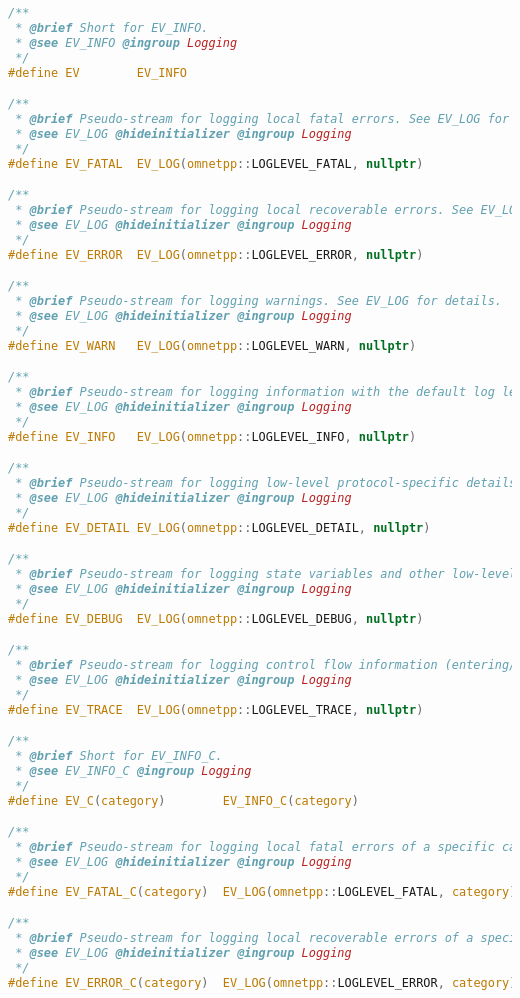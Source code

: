 \begin{lstlisting}[language=c]
/**
 * @brief Short for EV_INFO.
 * @see EV_INFO @ingroup Logging
 */
#define EV        EV_INFO

/**
 * @brief Pseudo-stream for logging local fatal errors. See EV_LOG for details.
 * @see EV_LOG @hideinitializer @ingroup Logging
 */
#define EV_FATAL  EV_LOG(omnetpp::LOGLEVEL_FATAL, nullptr)

/**
 * @brief Pseudo-stream for logging local recoverable errors. See EV_LOG for details.
 * @see EV_LOG @hideinitializer @ingroup Logging
 */
#define EV_ERROR  EV_LOG(omnetpp::LOGLEVEL_ERROR, nullptr)

/**
 * @brief Pseudo-stream for logging warnings. See EV_LOG for details.
 * @see EV_LOG @hideinitializer @ingroup Logging
 */
#define EV_WARN   EV_LOG(omnetpp::LOGLEVEL_WARN, nullptr)

/**
 * @brief Pseudo-stream for logging information with the default log level. See EV_LOG for details.
 * @see EV_LOG @hideinitializer @ingroup Logging
 */
#define EV_INFO   EV_LOG(omnetpp::LOGLEVEL_INFO, nullptr)

/**
 * @brief Pseudo-stream for logging low-level protocol-specific details. See EV_LOG for details.
 * @see EV_LOG @hideinitializer @ingroup Logging
 */
#define EV_DETAIL EV_LOG(omnetpp::LOGLEVEL_DETAIL, nullptr)

/**
 * @brief Pseudo-stream for logging state variables and other low-level information. See EV_LOG for details.
 * @see EV_LOG @hideinitializer @ingroup Logging
 */
#define EV_DEBUG  EV_LOG(omnetpp::LOGLEVEL_DEBUG, nullptr)

/**
 * @brief Pseudo-stream for logging control flow information (entering/exiting functions, etc). See EV_LOG for details.
 * @see EV_LOG @hideinitializer @ingroup Logging
 */
#define EV_TRACE  EV_LOG(omnetpp::LOGLEVEL_TRACE, nullptr)

/**
 * @brief Short for EV_INFO_C.
 * @see EV_INFO_C @ingroup Logging
 */
#define EV_C(category)        EV_INFO_C(category)

/**
 * @brief Pseudo-stream for logging local fatal errors of a specific category. See EV_LOG for details.
 * @see EV_LOG @hideinitializer @ingroup Logging
 */
#define EV_FATAL_C(category)  EV_LOG(omnetpp::LOGLEVEL_FATAL, category)

/**
 * @brief Pseudo-stream for logging local recoverable errors of a specific category. See EV_LOG for details.
 * @see EV_LOG @hideinitializer @ingroup Logging
 */
#define EV_ERROR_C(category)  EV_LOG(omnetpp::LOGLEVEL_ERROR, category)


\end{lstlisting}
